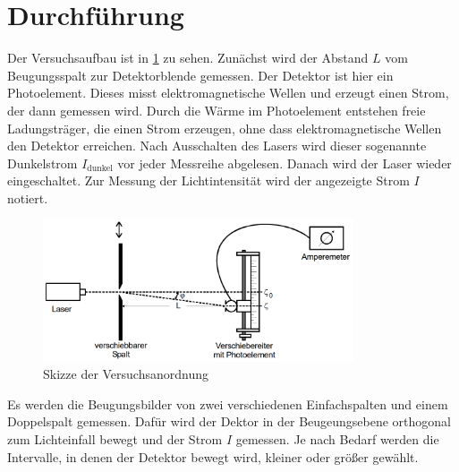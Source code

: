 \section{Durchführung}
\label{sec:Durchführung}

Der Versuchsaufbau ist in \ref{fig:aufbau} zu sehen. Zunächst wird der Abstand $L$
vom Beugungsspalt zur Detektorblende gemessen. Der Detektor ist hier ein Photoelement.
Dieses misst elektromagnetische Wellen und erzeugt einen Strom, der dann gemessen wird.
Durch die Wärme im Photoelement entstehen freie Ladungsträger, die einen Strom erzeugen,
ohne dass elektromagnetische Wellen den Detektor erreichen. Nach Ausschalten des Lasers
wird dieser sogenannte Dunkelstrom $I_\text{dunkel}$ vor jeder Messreihe abgelesen.
Danach wird der Laser wieder eingeschaltet. Zur Messung der Lichtintensität wird der
angezeigte Strom $I$ notiert.

\begin{figure}
  \centering
  \includegraphics[width=260pt]{data/aufbau.png}
  \caption{Skizze der Versuchsanordnung \cite{Versuchsanleitung}}
  \label{fig:aufbau}
\end{figure}

Es werden die Beugungsbilder von zwei verschiedenen Einfachspalten und einem Doppelspalt
gemessen. Dafür wird der Dektor in der Beugeungsebene orthogonal zum Lichteinfall
bewegt und der Strom $I$ gemessen. Je nach Bedarf werden die Intervalle, in denen der
Detektor bewegt wird, kleiner oder größer gewählt.
